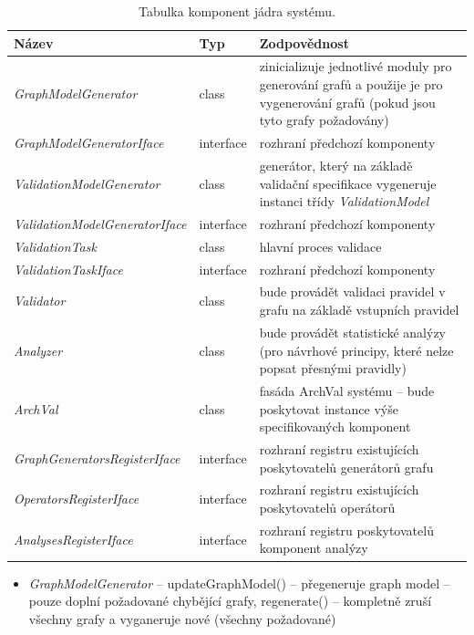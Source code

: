 \begin{table}
  \caption{Tabulka komponent jádra systému. \label{design-archval_core_components}}
  \begin{center}
    \begin{tabular}{ | l | l | p{7.5cm} | }
      \hline
      \textbf{Název} & \textbf{Typ} & \textbf{Zodpovědnost} \\
      \hline
      \hline
      \emph{GraphModelGenerator} & class & zinicializuje jednotlivé moduly pro generování grafů a použije je pro vygenerování grafů (pokud jsou tyto grafy požadovány) \\ \hline
      \emph{GraphModelGeneratorIface} & interface & rozhraní předchozí komponenty \\ \hline
      \emph{ValidationModelGenerator} & class & generátor, který na základě validační specifikace vygeneruje instanci třídy \mbox{\emph{ValidationModel}} \\ \hline
      \emph{ValidationModelGeneratorIface} & interface & rozhraní předchozí komponenty \\ \hline
      \emph{ValidationTask} & class & hlavní proces validace \\ \hline
      \emph{ValidationTaskIface} & interface & rozhraní předchozí komponenty \\ \hline
      \emph{Validator} & class & bude provádět validaci pravidel v grafu na základě vstupních pravidel \\ \hline
      \emph{Analyzer} & class & bude provádět statistické analýzy (pro návrhové principy, které nelze popsat přesnými pravidly) \\ \hline
      \emph{ArchVal} & class & fasáda ArchVal systému -- bude poskytovat instance výše specifikovaných komponent \\ \hline
      \hline
      \emph{GraphGeneratorsRegisterIface} & interface & rozhraní registru existujících poskytovatelů generátorů grafu \\ \hline
      \emph{OperatorsRegisterIface} & interface & rozhraní registru existujících poskytovatelů operátorů \\ \hline
      \emph{AnalysesRegisterIface} & interface & rozhraní registru poskytovatelů komponent analýzy \\ \hline
    \end{tabular}
  \end{center}

\end{table}

\begin{itemize}
\item \emph{GraphModelGenerator} -- updateGraphModel() -- přegeneruje graph model -- pouze doplní požadované chybějící grafy, regenerate() -- kompletně zruší všechny grafy a vyganeruje nové (všechny požadované)
\end{itemize}

